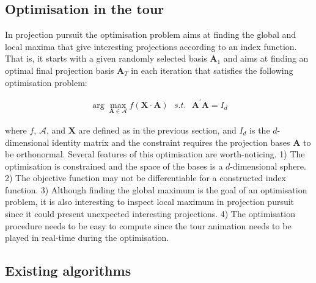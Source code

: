 \hypertarget{tour-optim}{%
\subsection{Optimisation in the tour}\label{tour-optim}}

In projection pursuit the optimisation problem aims at finding the
global and local maxima that give interesting projections according to
an index function. That is, it starts with a given randomly selected
basis \(\mathbf{A}_1\) and aims at finding an optimal final projection
basis \(\mathbf{A}_T\) in each iteration that satisfies the following
optimisation problem:

\begin{align}
\arg \max_{\mathbf{A} \in \mathcal{A}} f(\mathbf{X} \cdot \mathbf{A})  ~~~ s.t. ~~~ \mathbf{A}^{\prime} \mathbf{A} = I_d
\end{align}

\noindent where \(f\), \(\mathcal{A}\), and \(\mathbf{X}\) are defined
as in the previous section, and \(I_d\) is the \(d\)-dimensional
identity matrix and the constraint requires the projection bases
\(\mathbf{A}\) to be orthonormal. Several features of this optimisation
are worth-noticing. 1) The optimisation is constrained and the space of
the bases is a \(d\)-dimensional sphere. 2) The objective function may
not be differentiable for a constructed index function. 3) Although
finding the global maximum is the goal of an optimisation problem, it is
also interesting to inspect local maximum in projection pursuit since it
could present unexpected interesting projections. 4) The optimisation
procedure needs to be easy to compute since the tour animation needs to
be played in real-time during the optimisation.

\hypertarget{existing-algorithms}{%
\subsection{Existing algorithms}\label{existing-algorithms}}

